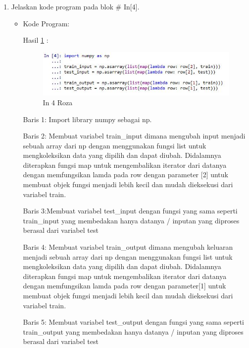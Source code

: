 \begin{enumerate}
\item Jelaskan kode program pada blok \# In[4].
\begin{itemize}
\item Kode Program:

\par Hasil \ref{in4roza} :
\begin{figure}[!hbtp]
\centering
\includegraphics[scale=0.7]{figures/prak4roza.jpg}
\caption{In 4 Roza}
\label{in4roza}
\end{figure}
\par Baris 1: Import library numpy sebagai np.
\par Baris 2: Membuat variabel train\_input dimana mengubah input menjadi sebuah array dari np dengan menggunakan fungsi list untuk mengkoleksikan data yang dipilih dan dapat diubah. Didalamnya diterapkan fungsi map untuk mengembalikan iterator dari datanya dengan memfungsikan lamda pada row dengan parameter [2] untuk membuat objek fungsi menjadi lebih kecil dan mudah dieksekusi dari variabel train.
\par Baris 3:Membuat variabel test\_input dengan fungsi yang sama seperti train\_input yang membedakan hanya datanya / inputan yang diproses berasal dari variabel test
\par Baris 4: Membuat variabel train\_output dimana mengubah keluaran menjadi sebuah array dari np dengan menggunakan fungsi list untuk mengkoleksikan data yang dipilih dan dapat diubah. Didalamnya diterapkan fungsi map untuk mengembalikan iterator dari datanya dengan memfungsikan lamda pada row dengan parameter[1] untuk membuat objek fungsi menjadi lebih kecil dan mudah dieksekusi dari variabel train.
\par Baris 5: Membuat variabel test\_output dengan fungsi yang sama seperti train\_output yang membedakan hanya datanya / inputan yang diproses berasal dari variabel test
\end{itemize}
\par


\end{enumerate}
